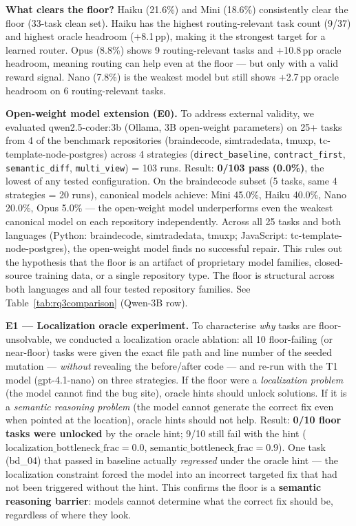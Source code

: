 \documentclass[sigconf,review,anonymous]{acmart}
\newcommand{\pp}{\,pp}
\begin{document}
\textbf{What clears the floor?} Haiku (21.6\%) and Mini (18.6\%) consistently clear the floor (33-task clean set). Haiku has the highest routing-relevant task count (9/37) and highest oracle headroom (+8.1\pp{}), making it the strongest target for a learned router. Opus (8.8\%) shows 9 routing-relevant tasks and +10.8\pp{} oracle headroom, meaning routing can help even at the floor — but only with a valid reward signal. Nano (7.8\%) is the weakest model but still shows +2.7\pp{} oracle headroom on 6 routing-relevant tasks.

\textbf{Open-weight model extension (E0).}
To address external validity, we evaluated qwen2.5-coder:3b (Ollama, 3B open-weight parameters) on 25+ tasks from 4 of the benchmark repositories (braindecode, simtradedata, tmuxp, tc-template-node-postgres) across 4 strategies (\texttt{direct\_baseline}, \texttt{contract\_first}, \texttt{semantic\_diff}, \texttt{multi\_view}) = 103 runs.
Result: \textbf{0/103 pass (0.0\%)}, the lowest of any tested configuration.
On the braindecode subset (5 tasks, same 4 strategies = 20 runs), canonical models achieve: Mini 45.0\%, Haiku 40.0\%, Nano 20.0\%, Opus 5.0\% — the open-weight model underperforms even the weakest canonical model on each repository independently.
Across all 25 tasks and both languages (Python: braindecode, simtradedata, tmuxp; JavaScript: tc-template-node-postgres), the open-weight model finds no successful repair. This rules out the hypothesis that the floor is an artifact of proprietary model families, closed-source training data, or a single repository type. The floor is structural across both languages and all four tested repository families. See Table~\ref{tab:rq3comparison} (Qwen-3B row).

\textbf{E1 — Localization oracle experiment.} To characterise \emph{why} tasks are floor-unsolvable, we conducted a localization oracle ablation: all 10 floor-failing (or near-floor) tasks were given the exact file path and line number of the seeded mutation — \emph{without} revealing the before/after code — and re-run with the T1 model (gpt-4.1-nano) on three strategies. If the floor were a \emph{localization problem} (the model cannot find the bug site), oracle hints should unlock solutions. If it is a \emph{semantic reasoning problem} (the model cannot generate the correct fix even when pointed at the location), oracle hints should not help. Result: \textbf{0/10 floor tasks were unlocked} by the oracle hint; 9/10 still fail with the hint ($\text{localization\_bottleneck\_frac} = 0.0$, $\text{semantic\_bottleneck\_frac} = 0.9$). One task (bd\_04) that passed in baseline actually \emph{regressed} under the oracle hint — the localization constraint forced the model into an incorrect targeted fix that had not been triggered without the hint. This confirms the floor is a \textbf{semantic reasoning barrier}: models cannot determine what the correct fix should be, regardless of where they look.
\end{document}
